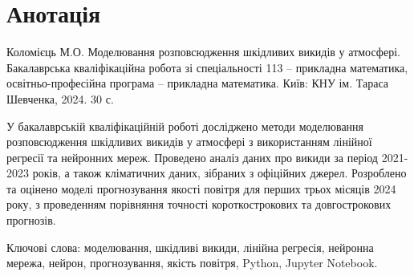 \chapter*{Анотація}


Коломієць М.О. Моделювання розповсюдження шкідливих викидів у атмосфері. 
Бакалаврська кваліфікаційна робота зі спеціальності 113 – прикладна математика, освітньо-професійна програма – прикладна математика. Київ: КНУ ім. Тараса Шевченка, 2024. 30 с.

У бакалаврській кваліфікаційній роботі досліджено методи моделювання розповсюдження шкідливих викидів у атмосфері з використанням лінійної регресії та нейронних мереж. 
Проведено аналіз даних про викиди за період 2021-2023 років, а також кліматичних даних, зібраних з офіційних джерел. 
Розроблено та оцінено моделі прогнозування якості повітря для перших трьох місяців 2024 року, з проведенням порівняння точності короткострокових та довгострокових прогнозів.

Ключові слова: моделювання, шкідливі викиди, лінійна регресія, нейронна мережа, нейрон, прогнозування, якість повітря, Python, Jupyter Notebook.
